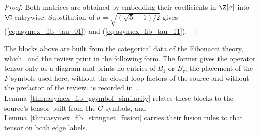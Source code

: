 \begin{proof}
    \leanok
    Both matrices are obtained by embedding their coefficients in
    $\Z[\sigma]$ into $\C$ entrywise. Substitution of
    $\sigma=\sqrt{(\sqrt5-1)/2}$ gives
    (\ref{eq:asymex_fib_tau_01}) and
    (\ref{eq:asymex_fib_tau_11}).
\end{proof}

The blocks above are built from the categorical data of the Fibonacci
theory, which~\cite[Appendix~D.1]{Bultinck2017Anyons} and the review
print in the following form. The former gives the operator tensor only
as a diagram and prints no entries of $B_1$ or $B_\tau$; the placement of the $F$-symbols used
here, without the closed-loop factors of the source and without the
prefactor of the review, is recorded in~\cite{gap:bmwshv17_fibonacci_block_entries_provenance}.
Lemma~\ref{thm:asymex_fib_gsymbol_similarity} relates these blocks to the
source's tensor built from the $G$-symbols, and
Lemma~\ref{thm:asymex_fib_stringnet_fusion} carries their fusion rules to
that tensor on both edge labels.

